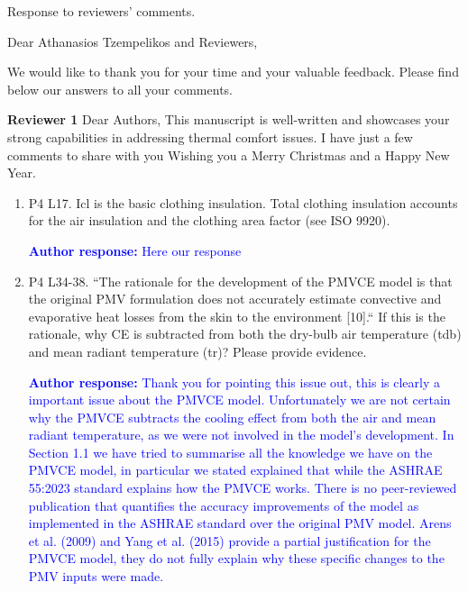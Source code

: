 \documentclass[a4paper, 10pt]{letter}
\newcommand{\response}[1]{\textcolor{blue}{\textbf{Author response:} #1}}
\begin{document}
    \begin{letter}
    {
        Response to reviewers' comments.
    }

        \opening{Dear Athanasios Tzempelikos and Reviewers,}


        We would like to thank you for your time and your valuable feedback.
        Please find below our answers to all your comments.

        \textbf{Reviewer 1}
        Dear Authors,
        This manuscript is well-written and showcases your strong capabilities in addressing thermal comfort issues.
        I have just a few comments to share with you Wishing you a Merry Christmas and a Happy New Year.

        \begin{enumerate}

            \item P4 L17.
            Icl is the basic clothing insulation.
            Total clothing insulation accounts for the air insulation and the clothing area factor (see ISO 9920).

            \response{
                Here our response
            }

            \item P4 L34-38.
            ``The rationale for the development of the PMVCE model is that the original PMV
            formulation does not accurately estimate convective and evaporative heat losses from
            the skin to the environment [10].`` If this is the rationale, why CE is subtracted from both
            the dry-bulb air temperature (tdb) and mean radiant temperature (tr)?
            Please provide evidence.

            \response{
                Thank you for pointing this issue out, this is clearly a important issue about the PMVCE model.
                Unfortunately we are not certain why the PMVCE subtracts the cooling effect from both the air and mean radiant temperature, as we were not involved in the model's development.
                In Section 1.1 we have tried to summarise all the knowledge we have on the PMVCE model, in particular we stated explained that while the ASHRAE 55:2023 standard explains how the PMVCE works.
                There is no peer-reviewed publication that quantifies the accuracy improvements of the model as implemented in the ASHRAE standard over the original PMV model.
                Arens et al. (2009) and Yang et al. (2015) provide a partial justification for the PMVCE model, they do not fully explain why these specific changes to the PMV inputs were made.
            }


\end{enumerate}
\end{letter}
\end{document}
